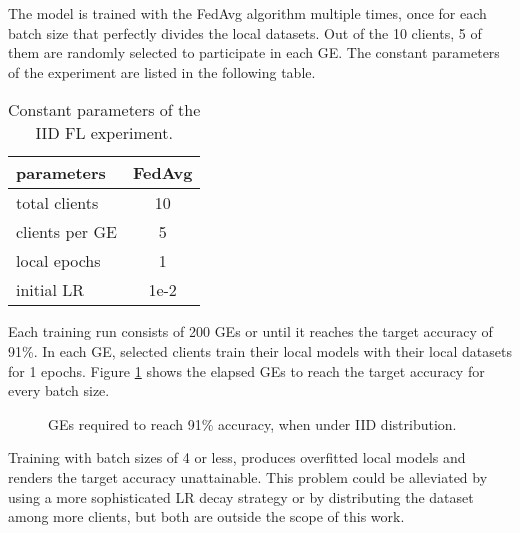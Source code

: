 The model is trained with the FedAvg algorithm multiple times, once for each batch size that perfectly divides the local datasets. Out of the 10 clients, 5 of them are randomly selected to participate in each GE. The constant parameters of the experiment are listed in the following table. %
\begin{table}[H]
    \center
    \begin{tabular}
        { | l | c | }
        \hline
        parameters & FedAvg\\\hline
        total clients   & 10\\\hline
        clients per GE  & 5\\\hline
        local epochs    & 1\\\hline
        initial LR      & 1e-2\\\hline
    \end{tabular}
    \caption[IID experiment parameters]{Constant parameters of the IID FL experiment.}
    \label{table: ΙID experiment parameters}
\end{table}

Each training run consists of 200 GEs or until it reaches the target accuracy of 91\%. In each GE, selected clients train their local models with their local datasets for 1 epochs. Figure \ref{fig: IID, GEs per batch size} shows the elapsed GEs to reach the target accuracy for every batch size.
\begin{figure}[H]
    \center
    \caption[ IID distribution, GEs per batch size ]{ GEs required to reach 91\% accuracy, when under IID distribution.}
    \label{fig: IID, GEs per batch size}
\end{figure}

Training with batch sizes of 4 or less, produces overfitted local models and renders the target accuracy unattainable. This problem could be alleviated by using a more sophisticated LR decay strategy or by distributing the dataset among more clients, but both are outside the scope of this work. %

